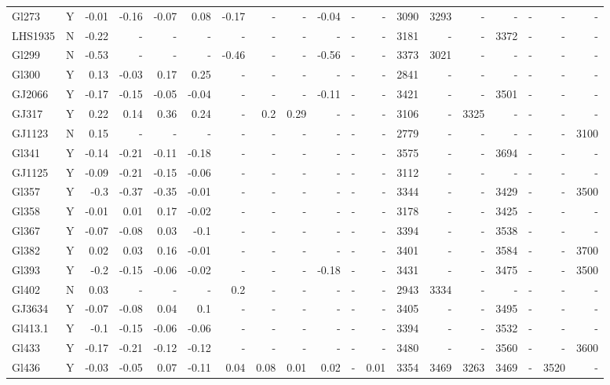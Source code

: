 \documentclass{aa}
\begin{document}
{\begin{landscape}
{\begin{longtable}{l c r r r r r r r r r r | r r r r r r r }
Gl273 & Y & -0.01 & -0.16 & -0.07 & 0.08 & -0.17 & - & - & -0.04 & - & - & 3090 & 3293 & - & - & - & - & - \\
LHS1935 & N & -0.22 & - & - & - & - & - & - & - & - & - & 3181 & - & - & 3372 & - & - & - \\
Gl299 & N & -0.53 & - & - & - & -0.46 & - & - & -0.56 & - & - & 3373 & 3021 & - & - & - & - & - \\
Gl300 & Y & 0.13 & -0.03 & 0.17 & 0.25 & - & - & - & - & - & - & 2841 & - & - & - & - & - & - \\
GJ2066 & Y & -0.17 & -0.15 & -0.05 & -0.04 & - & - & - & -0.11 & - & - & 3421 & - & - & 3501 & - & - & - \\
GJ317 & Y & 0.22 & 0.14 & 0.36 & 0.24 & - & 0.2 & 0.29 & - & - & - & 3106 & - & 3325 & - & - & - & - \\
GJ1123 & N & 0.15 & - & - & - & - & - & - & - & - & - & 2779 & - & - & - & - & - & 3100 \\
Gl341 & Y & -0.14 & -0.21 & -0.11 & -0.18 & - & - & - & - & - & - & 3575 & - & - & 3694 & - & - & - \\
GJ1125 & Y & -0.09 & -0.21 & -0.15 & -0.06 & - & - & - & - & - & - & 3112 & - & - & - & - & - & - \\
Gl357 & Y & -0.3 & -0.37 & -0.35 & -0.01 & - & - & - & - & - & - & 3344 & - & - & 3429 & - & - & 3500 \\
Gl358 & Y & -0.01 & 0.01 & 0.17 & -0.02 & - & - & - & - & - & - & 3178 & - & - & 3425 & - & - & - \\
Gl367 & Y & -0.07 & -0.08 & 0.03 & -0.1 & - & - & - & - & - & - & 3394 & - & - & 3538 & - & - & - \\
Gl382 & Y & 0.02 & 0.03 & 0.16 & -0.01 & - & - & - & - & - & - & 3401 & - & - & 3584 & - & - & 3700 \\
Gl393 & Y & -0.2 & -0.15 & -0.06 & -0.02 & - & - & - & -0.18 & - & - & 3431 & - & - & 3475 & - & - & 3500 \\
Gl402 & N & 0.03 & - & - & - & 0.2 & - & - & - & - & - & 2943 & 3334 & - & - & - & - & - \\
GJ3634 & Y & -0.07 & -0.08 & 0.04 & 0.1 & - & - & - & - & - & - & 3405 & - & - & 3495 & - & - & - \\
Gl413.1 & Y & -0.1 & -0.15 & -0.06 & -0.06 & - & - & - & - & - & - & 3394 & - & - & 3532 & - & - & - \\
Gl433 & Y & -0.17 & -0.21 & -0.12 & -0.12 & - & - & - & - & - & - & 3480 & - & - & 3560 & - & - & 3600 \\
Gl436 & Y & -0.03 & -0.05 & 0.07 & -0.11 & 0.04 & 0.08 & 0.01 & 0.02 & - & 0.01 & 3354 & 3469 & 3263 & 3469 & - & 3520 & - \\

\end{longtable}}
\end{landscape}}
\end{document}
